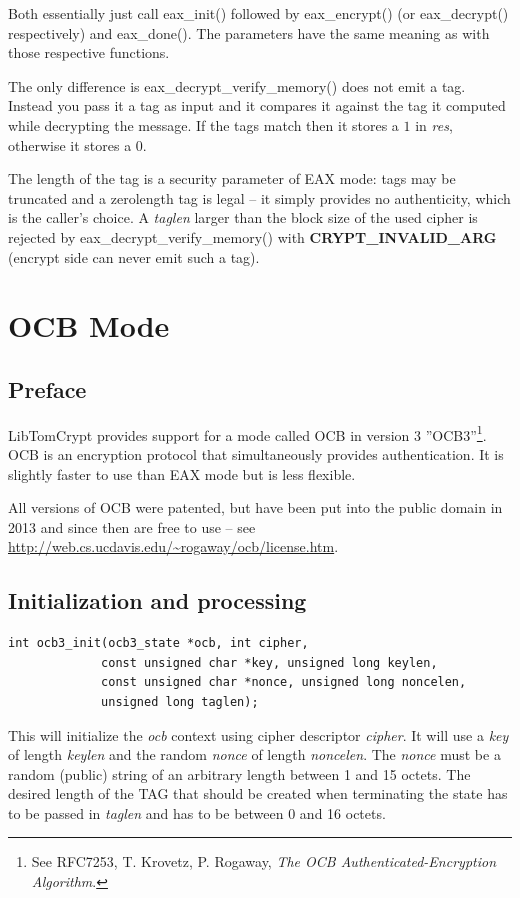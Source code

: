 \documentclass[synpaper]{book}
\newcommand{\mysection}[1]    %
	{                   %
	\section{#1}
   \markboth{\textsf{www.libtom.net}}{\thesection ~ {#1}}
	}
\begin{document}
Both essentially just call eax\_init() followed by eax\_encrypt() (or eax\_decrypt() respectively) and eax\_done().  The parameters
have the same meaning as with those respective functions.

The only difference is eax\_decrypt\_verify\_memory() does not emit a tag.  Instead you pass it a tag as input and it compares it against
the tag it computed while decrypting the message.  If the tags match then it stores a $1$ in \textit{res}, otherwise it stores a $0$.

The length of the tag is a security parameter of EAX mode: tags may be truncated and a zerolength tag is legal -- it simply
provides no authenticity, which is the caller's choice.  A \textit{taglen} larger than the block size of the used cipher is rejected
by eax\_decrypt\_verify\_memory() with \textbf{CRYPT\_INVALID\_ARG} (encrypt side can never emit such a tag).

\mysection{OCB Mode}
\subsection{Preface}

LibTomCrypt provides support for a mode called OCB in version 3
''OCB3''\footnote{See RFC7253, T. Krovetz, P. Rogaway, \textit{The OCB Authenticated-Encryption Algorithm}.}.
OCB is an encryption protocol that simultaneously provides authentication.  It is slightly faster to use than EAX mode
but is less flexible.

All versions of OCB were patented, but have been put into the public domain in 2013 and since then are free to use
-- see \url{http://web.cs.ucdavis.edu/~rogaway/ocb/license.htm}.

\subsection{Initialization and processing}

\begin{verbatim}
int ocb3_init(ocb3_state *ocb, int cipher,
             const unsigned char *key, unsigned long keylen,
             const unsigned char *nonce, unsigned long noncelen,
             unsigned long taglen);
\end{verbatim}

This will initialize the \textit{ocb} context using cipher descriptor \textit{cipher}.  It will use a \textit{key} of length \textit{keylen}
and the random \textit{nonce} of length \textit{noncelen}.  The \textit{nonce} must be a random (public) string of an arbitrary length
between 1 and 15 octets.  The desired length of the TAG that should be created when terminating the state has to be passed in \textit{taglen}
and has to be between 0 and 16 octets.
\end{document}
